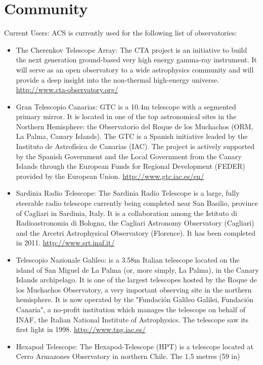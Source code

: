 \section{Community}
Current Users: ACS is currently used for the following list of observatories:
\begin{itemize}
	\item The Cherenkov Telescope Array: The CTA project is an initiative to build the next generation ground-based very high energy gamma-ray instrument. It 
		will serve as an open observatory to a wide astrophysics community and will provide a deep insight into the non-thermal high-energy universe.
		\url{http://www.cta-observatory.org/}
	\item Gran Telescopio Canarias: GTC  is a 10.4m telescope with a segmented primary mirror. It is located in one of the top astronomical sites in the Northern 
		Hemisphere: the Observatorio del Roque de los Muchachos (ORM, La Palma, Canary Islands). The GTC is a Spanish initiative leaded by the Instituto de 
		Astrofísica de Canarias (IAC). The project is actively supported by the Spanish Government and the Local Government from the Canary Islands through 
		the European Funds for Regional Development (FEDER) provided by the European Union.
		\url{http://www.gtc.iac.es/en/}
	\item Sardinia Radio Telescope: The Sardinia Radio Telescope is a large, fully steerable radio telescope currently being completed near San Basilio, province 
		of Cagliari in Sardinia, Italy. It is a collaboration among the Istituto di Radioastronomia di Bologna, the Cagliari Astronomy Observatory (Cagliari) 
		and the Arcetri Astrophysical Observatory (Florence). It has been completed in 2011.
		\url{http://www.srt.inaf.it/}
	\item Telescopio Nazionale Galileo: is a 3.58m Italian telescope located on the island of San Miguel de La Palma (or, more simply, La Palma), in the Canary 
		Islands archipelago. It is one of the largest telescopes hosted by the Roque de los Muchachos Observatory, a very important observing site in the 
		northern hemisphere. It is now operated by the "Fundación Galileo Galilei, Fundación Canaria", a no-profit institution which manages the telescope 
		on behalf of INAF, the Italian National Institute of Astrophysics. The telescope saw its first light in 1998. 
		\url{http://www.tng.iac.es/}
	\item Hexapod Telescope: The Hexapod-Telescope (HPT) is a telescope located at Cerro Armazones Observatory in northern Chile. The 1.5 metres (59 in) 

\end{itemize}
